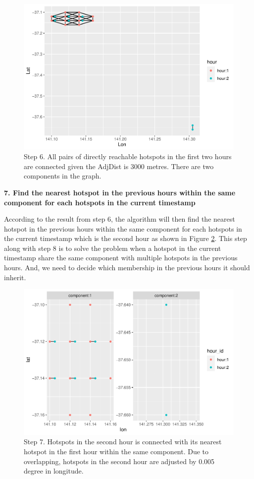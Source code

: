 \begin{Schunk}
\begin{figure}
\includegraphics[width=0.8\linewidth]{clustering_paper_files/figure-latex/step6-1} \caption[Step 6]{Step 6. All pairs of directly reachable hotspots in the first two hours are connected given the AdjDist is 3000 metres. There are two components in the graph.}\label{fig:step6}
\end{figure}
\end{Schunk}

\textbf{7. Find the nearest hotspot in the previous hours within the
same component for each hotspots in the current timestamp}

According to the result from step 6, the algorithm will then find the
nearest hotspot in the previous hours within the same component for each
hotspots in the current timestamp which is the second hour as shown in
Figure \ref{fig:step7}. This step along with step 8 is to solve the
problem when a hotspot in the current timestamp share the same component
with multiple hotspots in the previous hours. And, we need to decide
which membership in the previous hours it should inherit.

\begin{Schunk}
\begin{figure}
\includegraphics[width=0.8\linewidth]{clustering_paper_files/figure-latex/step7-1} \caption[Step 7]{Step 7. Hotspots in the second hour is connected with its nearest hotspot in the first hour within the same component. Due to overlapping, hotspots in the second hour are adjusted by 0.005 degree in longitude.}\label{fig:step7}
\end{figure}
\end{Schunk}

